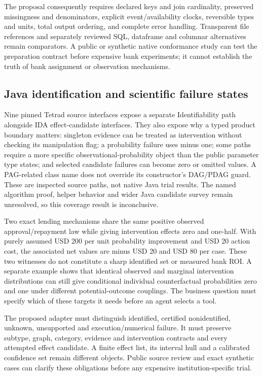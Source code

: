 The proposal consequently requires declared keys and join cardinality,
preserved missingness and denominators, explicit event/availability
clocks, reversible types and units, total output ordering, and complete
error handling. Transparent file references and separately reviewed SQL,
dataframe and columnar alternatives remain comparators. A public or
synthetic native conformance study can test the preparation contract
before expensive bank experiments; it cannot establish the truth of bank
assignment or observation mechanisms.

\hypertarget{java-identification-and-scientific-failure-states}{%
\subsection{Java identification and scientific failure
states}\label{java-identification-and-scientific-failure-states}}

Nine pinned Tetrad source interfaces expose a separate Identifiability
path alongside IDA effect-candidate interfaces. They also expose why a
typed product boundary matters: singleton evidence can be treated as
intervention without checking its manipulation flag; a probability
failure uses minus one; some paths require a more specific
observational-probability object than the public parameter type states;
and selected candidate failures can become zero or omitted values. A
PAG-related class name does not override its constructor's DAG/PDAG
guard. These are inspected source paths, not native Java trial results.
The named algorithm proof, helper behavior and wider Java candidate
survey remain unresolved, so this coverage result is inconclusive.
\citep{exec19_javaid_source}

Two exact lending mechanisms share the same positive observed
approval/repayment law while giving intervention effects zero and
one-half. With purely assumed USD 200 per unit probability improvement
and USD 20 action cost, the associated net values are minus USD 20 and
USD 80 per case. These two witnesses do not constitute a sharp
identified set or measured bank ROI. A separate example shows that
identical observed and marginal intervention distributions can still
give conditional individual counterfactual probabilities zero and one
under different potential-outcome couplings. The business question must
specify which of these targets it needs before an agent selects a tool.
\citep{exec19_javaid_reference}

The proposed adapter must distinguish identified, certified
nonidentified, unknown, unsupported and execution/numerical failure. It
must preserve subtype, graph, category, evidence and intervention
contracts and every attempted effect candidate. A finite effect list,
its interval hull and a calibrated confidence set remain different
objects. Public source review and exact synthetic cases can clarify
these obligations before any expensive institution-specific trial.

